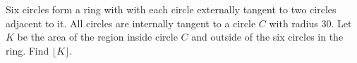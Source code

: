 Six circles form a ring with with each circle externally tangent to two circles adjacent to it. All circles are internally tangent to a circle $C$ with radius $30$. Let $K$ be the area of the region inside circle $C$ and outside of the six circles in the ring. Find $\lfloor K \rfloor$.
